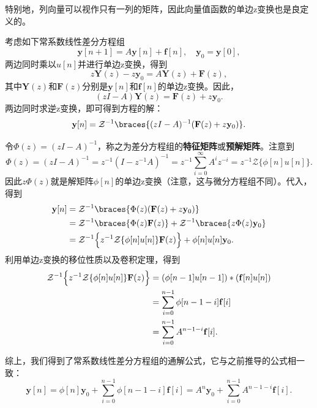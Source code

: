 特别地，列向量可以视作只有一列的矩阵，因此向量值函数的单边z变换也是良定义的。

考虑如下常系数线性差分方程组
\begin{equation}
    \mathbf{y}[n+1]=A\mathbf{y}[n]+\mathbf{f}[n],\quad \mathbf{y}_0=\mathbf{y}[0],
\end{equation}
两边同时乘以$u[n]$并进行单边z变换，得到
\begin{equation}
    z\mathbf{Y}(z)-z\mathbf{y}_0=A\mathbf{Y}(z)+\mathbf{F}(z),
\end{equation}
其中$\mathbf{Y}(z)$和$\mathbf{F}(z)$分别是$\mathbf{y}[n]$和$\mathbf{f}[n]$的单边z变换。因此，
\begin{equation}
    (zI-A)\mathbf{Y}(z)=\mathbf{F}(z)+z\mathbf{y}_0.
\end{equation}
两边同时求逆z变换，即可得到方程的解：
\begin{equation}
    \mathbf{y}[n]=\mathcal{Z}^{-1}\braces{(zI-A)^{-1}(\mathbf{F}(z)+z\mathbf{y}_0)}.\label{eq:diff_sys_z_sol}
\end{equation}

令$\Phi(z)=(zI-A)^{-1}$，称之为差分方程组的\textbf{特征矩阵}或\textbf{预解矩阵}。注意到
\begin{equation}
    \Phi(z)=(zI-A)^{-1}=z^{-1}(I-z^{-1}A)^{-1}=z^{-1}\sum_{i=0}^{\infty}A^i z^{-i}=z^{-1}\mathcal{Z}\{\phi[n]u[n]\}.
\end{equation}
因此$z\Phi(z)$就是解矩阵$\phi[n]$的单边z变换（注意，这与微分方程组不同）。代入，得到
\begin{align}
    \mathbf{y}[n]&=\mathcal{Z}^{-1}\braces{\Phi(z)(\mathbf{F}(z)+z\mathbf{y}_0)} \nonumber \\
    &=\mathcal{Z}^{-1}\braces{\Phi(z)\mathbf{F}(z)}+\mathcal{Z}^{-1}\braces{z\Phi(z)\mathbf{y}_0} \nonumber \\
    &=\mathcal{Z}^{-1}\Bigl\{z^{-1}\mathcal{Z}\{\phi[n]u[n]\}\mathbf{F}(z)\Bigr\}+\phi[n]u[n]\mathbf{y}_0.
\end{align}
利用单边z变换的移位性质以及卷积定理，得到
\begin{align}
    \mathcal{Z}^{-1}\Bigl\{z^{-1}\mathcal{Z}\{\phi[n]u[n]\}\mathbf{F}(z)\Bigr\}&=(\phi[n-1]u[n-1])*(\mathbf{f}[n]u[n]) \nonumber \\
    &=\sum_{i=0}^{n-1}\phi[n-1-i]\mathbf{f}[i] \nonumber \\
    &=\sum_{i=0}^{n-1}A^{n-1-i}\mathbf{f}[i].
\end{align}

综上，我们得到了常系数线性差分方程组的通解公式，它与之前推导的公式相一致：
\begin{equation}
    \mathbf{y}[n]=\phi[n]\mathbf{y}_0+\sum_{i=0}^{n-1}\phi[n-1-i]\mathbf{f}[i]=A^n\mathbf{y}_0+\sum_{i=0}^{n-1}A^{n-1-i}\mathbf{f}[i].
\end{equation}


